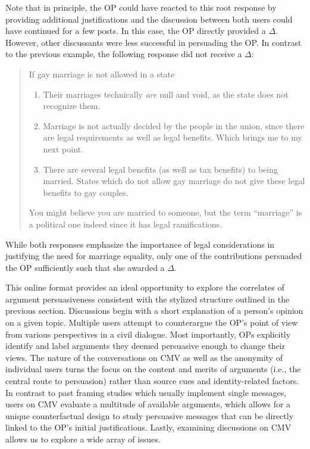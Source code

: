 Note that in principle, the OP could have reacted to this root response by providing additional justifications and the discussion between both users could have continued for a few posts. In this case, the OP directly provided a $\Delta$. However, other discussants were less successful in persuading the OP. In contrast to the previous example, the following response did not receive a $\Delta$:
\begin{quote}\singlespacing
If gay marriage is not allowed in a state
\begin{enumerate}
\item Their marriages technically \textit{are} null and void, as the state does not recognize them.
\item Marriage is not actually decided by the people in the union, since there are legal requirements as well as legal benefits. Which brings me to my next point.
\item There are several legal benefits (as well as tax benefits) to being married. States which do not allow gay marriage do not give these legal benefits to gay couples.      
\end{enumerate}
You might believe you are married to someone, but the term ``marriage'' is a political one indeed since it has legal ramifications.
\end{quote}
While both responses emphasize the importance of legal considerations in justifying the need for marriage equality, only one of the contributions persuaded the OP sufficiently such that she awarded a $\Delta$. 

This online format provides an ideal opportunity to explore the correlates of argument persuasiveness consistent with the stylized structure outlined in the previous section. Discussions begin with a short explanation of a person's opinion on a given topic. Multiple users attempt to counterargue the OP's point of view from various perspectives in a civil dialogue. Most importantly, OPs explicitly identify and label arguments they deemed persuasive enough to change their views. The nature of the conversations on CMV as well as the anonymity of individual users turns the focus on the content and merits of arguments (i.e., the central route to persuasion) rather than source cues and identity-related factors. In contrast to past framing studies which usually implement single messages, users on CMV evaluate a multitude of available arguments, which allows for a unique counterfactual design to study persuasive messages that can be directly linked to the OP's initial justifications. Lastly, examining discussions on CMV allows us to explore a wide array of issues.

